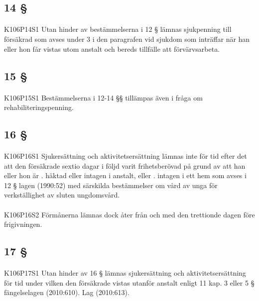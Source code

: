 \documentclass[a4paper,notitlepage,openany,10pt]{book}
\begin{document}
\subsection*{14 §}
\paragraph*{}
{\tiny K106P14S1}
Utan hinder av bestämmelserna i 12 § lämnas sjukpenning till försäkrad som avses under 3 i den paragrafen vid sjukdom som inträffar när han eller hon får vistas utom anstalt och bereds tillfälle att förvärvsarbeta.
\subsection*{15 §}
\paragraph*{}
{\tiny K106P15S1}
Bestämmelserna i 12-14 §§ tillämpas även i fråga om rehabiliteringspenning.
\subsection*{16 §}
\paragraph*{}
{\tiny K106P16S1}
Sjukersättning och aktivitetsersättning lämnas inte för tid efter det att den försäkrade sextio dagar i följd varit frihetsberövad på grund av att han eller hon är
. häktad eller intagen i anstalt, eller
. intagen i ett hem som avses i 12 § lagen (1990:52) med särskilda bestämmelser om vård av unga för verkställighet av sluten ungdomsvård.
\paragraph*{}
{\tiny K106P16S2}
Förmånerna lämnas dock åter från och med den trettionde dagen före frigivningen.
\subsection*{17 §}
\paragraph*{}
{\tiny K106P17S1}
Utan hinder av 16 § lämnas sjukersättning och aktivitetsersättning för tid under vilken den försäkrade vistas utanför anstalt enligt 11 kap. 3 eller 5 § fängelselagen (2010:610).
Lag (2010:613).
\end{document}
